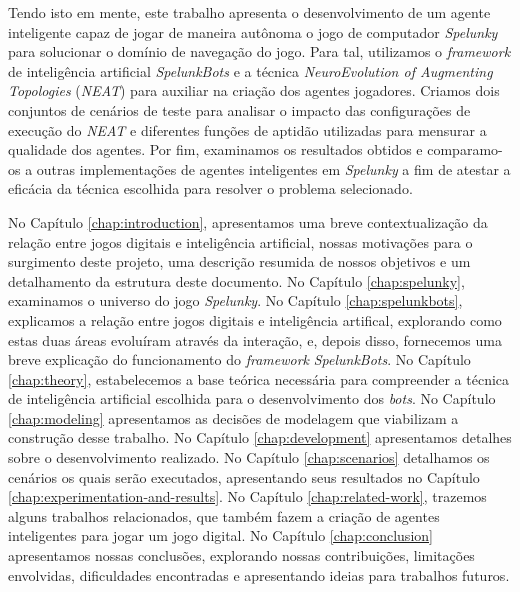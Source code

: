 Tendo isto em mente, este trabalho apresenta o desenvolvimento de um agente
inteligente capaz de jogar de maneira autônoma o jogo de computador
\textit{Spelunky} para solucionar o domínio de navegação do jogo. Para tal,
utilizamos o \textit{framework} de inteligência artificial \textit{SpelunkBots}
e a técnica \textit{NeuroEvolution of Augmenting Topologies} (\textit{NEAT})
para auxiliar na criação dos agentes jogadores. Criamos dois conjuntos de
cenários de teste para analisar o impacto das configurações de execução do
\textit{NEAT} e diferentes funções de aptidão utilizadas para mensurar a
qualidade dos agentes. Por fim, examinamos os resultados obtidos e comparamo-os
a outras implementações de agentes inteligentes em \textit{Spelunky} a fim de
atestar a eficácia da técnica escolhida para resolver o problema selecionado.

No Capítulo \ref{chap:introduction}, apresentamos uma breve contextualização da
relação entre jogos digitais e inteligência artificial, nossas motivações para o
surgimento deste projeto, uma descrição resumida de nossos objetivos e um
detalhamento da estrutura deste documento. No Capítulo \ref{chap:spelunky},
examinamos o universo do jogo \textit{Spelunky}. No Capítulo
\ref{chap:spelunkbots}, explicamos a relação entre jogos digitais e inteligência
artifical, explorando como estas duas áreas evoluíram através da interação, e,
depois disso, fornecemos uma breve explicação do funcionamento do
\textit{framework} \textit{SpelunkBots}. No Capítulo \ref{chap:theory},
estabelecemos a base teórica necessária para compreender a técnica de
inteligência artificial escolhida para o desenvolvimento dos \textit{bots}. No
Capítulo \ref{chap:modeling} apresentamos as decisões de modelagem que
viabilizam a construção desse trabalho. No Capítulo \ref{chap:development}
apresentamos detalhes sobre o desenvolvimento realizado.  No Capítulo
\ref{chap:scenarios} detalhamos os cenários os quais serão executados,
apresentando seus resultados no Capítulo \ref{chap:experimentation-and-results}.
No Capítulo \ref{chap:related-work}, trazemos alguns trabalhos relacionados, que
também fazem a criação de agentes inteligentes para jogar um jogo digital. No
Capítulo \ref{chap:conclusion} apresentamos nossas conclusões, explorando nossas
contribuições, limitações envolvidas, dificuldades encontradas e apresentando
ideias para trabalhos futuros.
